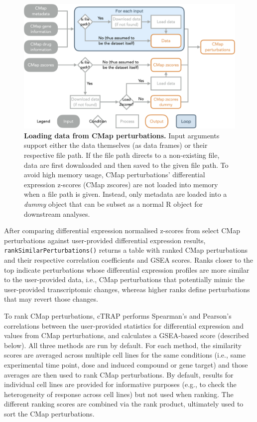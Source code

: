 \begin{figure}[!t]
  \includegraphics[width=.8\textwidth]{images/ctrap/cmap-perturbations}
  \centering
  \caption[Loading data from CMap perturbations]{\textbf{Loading data from CMap perturbations.} Input arguments support either the data themselves (as data frames) or their respective file path. If the file path directs to a non-existing file,  data are first downloaded and then saved to the given file path. To avoid high memory usage, CMap perturbations' differential expression z-scores (CMap zscores) are not loaded into memory when a file path is given. Instead, only metadata are loaded into a \emph{dummy} object that can be subset as a normal R object for downstream analyses.}
  \label{fig:ctrap-cmap-perturbations}
\end{figure}


After comparing differential expression normalised z-scores from select CMap perturbations against user-provided differential expression results, \texttt{rankSimilarPerturbations()} returns a table with ranked CMap perturbations and their respective correlation coefficients and GSEA scores. Ranks closer to the top indicate perturbations whose differential expression profiles are more similar to the user-provided data, i.e., CMap perturbations that potentially mimic the user-provided transcriptomic changes, whereas higher ranks define perturbations that may revert those changes.

To rank CMap perturbations, cTRAP performs Spearman's and Pearson's correlations between the user-provided statistics for differential expression and values from CMap perturbations, and calculates a GSEA-based score (described below). All three methods are run by default. For each method, the similarity scores are averaged across multiple cell lines for the same conditions (i.e., same experimental time point, dose and induced compound or gene target) and those averages are then used to rank CMap perturbations. By default, results for individual cell lines are provided for informative purposes (e.g., to check the heterogeneity of response across cell lines) but not used when ranking. The different ranking scores are combined via the rank product, ultimately used to sort the CMap perturbations. %

